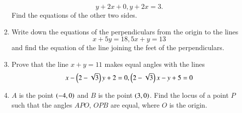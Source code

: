 \begin{enumerate}[1.]
\begin{equation*}
y + 2x + 0, y + 2x = 3.
\end{equation*}
Find the equations of the other two sides.
\item Write down the equations of the perpendiculars from the origin to the lines
\begin{equation*}
x + 5y = 18, 5x+y = 13
\end{equation*}
and find the equation of the line joining the feet of the perpendiculars.
\item Prove that the line $x + y = 11$ makes equal angles with the lines
\begin{equation*}
x-\left(2-\sqrt{3}\right)y + 2 = 0, \left(2-\sqrt{3}\right)x - y + 5 = 0
\end{equation*}
\item $A$ is the point $\left(-4,0\right)$ and $B$ is the point $\left(3,0\right)$.  Find the locus of a point $P$ such that the angles $APO$, $OPB$ are equal, where $O$ is the origin.
\end{enumerate}